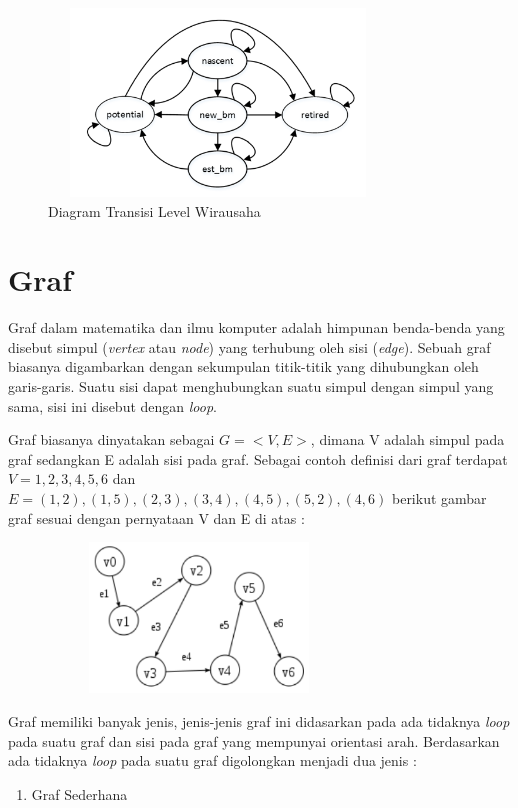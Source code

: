 \begin{enumerate}
	\begin{figure} [H]
		\centering  
		\includegraphics[width=9cm, height=5cm]{tingkatwirausaha} 
		\caption[Diagram Transisi Level Wirausaha]{Diagram Transisi Level Wirausaha} 
		\label{fig:tingkatwirausaha} 
	\end{figure}



\section{Graf}
\label{sec:graf}
Graf dalam matematika dan ilmu komputer adalah himpunan benda-benda yang disebut simpul (\textit{vertex} atau \textit{node}) yang terhubung oleh sisi (\textit{edge}). Sebuah graf biasanya digambarkan dengan sekumpulan titik-titik yang dihubungkan oleh garis-garis. Suatu sisi dapat menghubungkan suatu simpul dengan simpul yang sama, sisi ini disebut dengan \textit{loop}.

Graf biasanya dinyatakan sebagai $G = <V,E>$, dimana V adalah simpul pada graf sedangkan E adalah sisi pada graf. Sebagai contoh definisi dari graf terdapat $V = {1,2,3,4,5,6}$ dan $E = {(1,2),(1,5),(2,3),(3,4),(4,5),(5,2),(4,6)}$ berikut gambar graf sesuai dengan pernyataan V dan E di atas :

	\begin{figure} [H]
		\centering  
		\includegraphics[width=8cm, height=4cm]{graf1} 
		\label{fig:graf1} 
	\end{figure}
	
Graf memiliki banyak jenis, jenis-jenis graf ini didasarkan pada ada tidaknya \textit{loop} pada suatu graf dan sisi pada graf yang mempunyai orientasi arah. Berdasarkan ada tidaknya \textit{loop} pada suatu graf digolongkan menjadi dua jenis :
\begin{enumerate}
	\item Graf Sederhana
	

\end{enumerate}
\end{enumerate}
